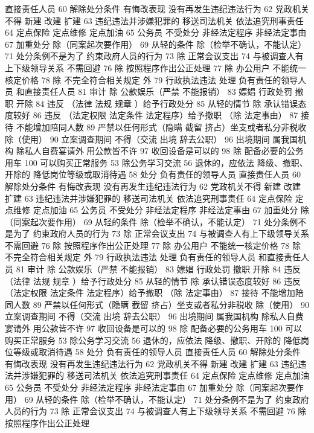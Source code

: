 \documentclass[cyan]{elegantnote}
\begin{document}
直接责任人员
60 解除处分条件
有悔改表现
没有再发生违纪违法行为
62 党政机关不得
新建 改建 扩建
63 违纪违法并涉嫌犯罪的
移送司法机关
依法追究刑事责任
64 定点保险 定点维修 定点加油
65 公务员 不受处分
非经法定程序
非经法定事由
67 加重处分
除（同案起次要作用）
69 从轻的条件
除（检举不确认，不能认定）
71 处分条例不是为了
约束政府人员的行为
73 除 正常会议支出
74 与被调查人有上下级领导关系 不需回避
76 除 按照程序作出公正处理
77 除 办公用户
不能统一核定价格
78 除 不完全符合相关规定 外
79 行政执法违法 处理
负有责任的领导人员
和直接责任人员
81 审计
除 公款娱乐（严禁 不能报销）
83 嫖娼 行政处罚
撤职 开除
84 违反 （法律 法规 规章 ）给予行政处分
85 从轻的情节
除 承认错误态度较好
86 违反 （法定权限 法定条件 法定程序）给予撤职
（除 法定事由）
87 接待 不能增加陪同人数
89 严禁以任何形式（隐瞒 截留 挤占）坐支或者私分非税收
除（使用）
90 立案调查期间 不得（交流 出境 辞去公职）
96 出境期间 属我国机构 除私人自费宴请外 用公款皆不许
97 收回设备是可以的
98 除 配备必要的公务用车
100 可以购买正常服务
53 除公务学习交流
56 退休的，应依法
降级、撤职、开除的 降低岗位等级或取消待遇
58 处分
负有责任的领导人员
直接责任人员
60 解除处分条件
有悔改表现
没有再发生违纪违法行为
62 党政机关不得
新建 改建 扩建
63 违纪违法并涉嫌犯罪的
移送司法机关
依法追究刑事责任
64 定点保险 定点维修 定点加油
65 公务员 不受处分
非经法定程序
非经法定事由
67 加重处分
除（同案起次要作用）
69 从轻的条件
除（检举不确认，不能认定）
71 处分条例不是为了
约束政府人员的行为
73 除 正常会议支出
74 与被调查人有上下级领导关系 不需回避
76 除 按照程序作出公正处理
77 除 办公用户
不能统一核定价格
78 除 不完全符合相关规定 外
79 行政执法违法 处理
负有责任的领导人员
和直接责任人员
81 审计
除 公款娱乐（严禁 不能报销）
83 嫖娼 行政处罚
撤职 开除
84 违反 （法律 法规 规章 ）给予行政处分
85 从轻的情节
除 承认错误态度较好
86 违反 （法定权限 法定条件 法定程序）给予撤职
（除 法定事由）
87 接待 不能增加陪同人数
89 严禁以任何形式（隐瞒 截留 挤占）坐支或者私分非税收
除（使用）
90 立案调查期间 不得（交流 出境 辞去公职）
96 出境期间 属我国机构 除私人自费宴请外 用公款皆不许
97 收回设备是可以的
98 除 配备必要的公务用车
100 可以购买正常服务
53 除公务学习交流
56 退休的，应依法
降级、撤职、开除的 降低岗位等级或取消待遇
58 处分
负有责任的领导人员
直接责任人员
60 解除处分条件
有悔改表现
没有再发生违纪违法行为
62 党政机关不得
新建 改建 扩建
63 违纪违法并涉嫌犯罪的
移送司法机关
依法追究刑事责任
64 定点保险 定点维修 定点加油
65 公务员 不受处分
非经法定程序
非经法定事由
67 加重处分
除（同案起次要作用）
69 从轻的条件
除（检举不确认，不能认定）
71 处分条例不是为了
约束政府人员的行为
73 除 正常会议支出
74 与被调查人有上下级领导关系 不需回避
76 除 按照程序作出公正处理
\end{document}
